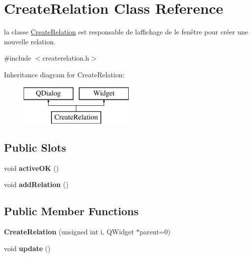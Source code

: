 \hypertarget{classCreateRelation}{}\section{Create\+Relation Class Reference}
\label{classCreateRelation}


la classe \hyperlink{classCreateRelation}{Create\+Relation} est responsable de l\textquotesingle{}affichage de le fenêtre pour créer une nouvelle relation.  




{\ttfamily \#include $<$createrelation.\+h$>$}

Inheritance diagram for Create\+Relation\+:\begin{figure}[H]
\begin{center}
\leavevmode
\includegraphics[height=2.000000cm]{classCreateRelation}
\end{center}
\end{figure}
\subsection*{Public Slots}
\begin{DoxyCompactItemize}
\item 
\mbox{\label{classCreateRelation_aeb75aeba2071d29d88bc23218c6aff95}} 
void {\bfseries active\+OK} ()
\item 
\mbox{\label{classCreateRelation_a6de7ef9d8a715ddde4c9d7b8c7cae122}} 
void {\bfseries add\+Relation} ()
\end{DoxyCompactItemize}
\subsection*{Public Member Functions}
\begin{DoxyCompactItemize}
\item 
\mbox{\label{classCreateRelation_acbaf841f6dc971224a1e0ee717c26446}} 
{\bfseries Create\+Relation} (unsigned int i, Q\+Widget $\ast$parent=0)
\item 
\mbox{\label{classCreateRelation_aa9f46ceb2b81ba96cd43fcbcee9757d9}} 
void {\bfseries update} ()
\end{DoxyCompactItemize}
